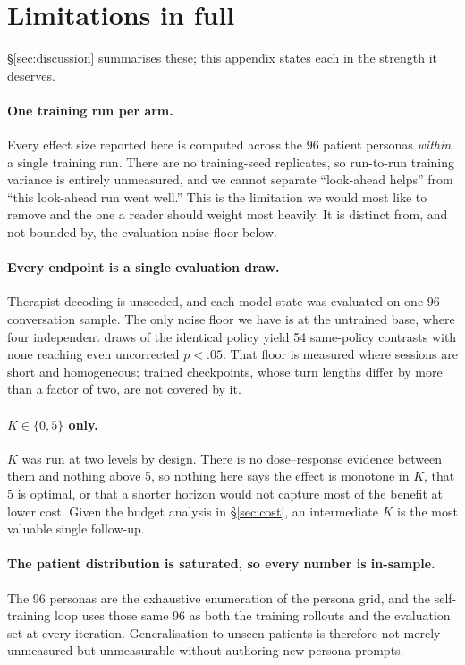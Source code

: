 \section{Limitations in full}
\label{app:limitations}

\S\ref{sec:discussion} summarises these; this appendix states each in the strength it deserves.

\paragraph{One training run per arm.}
Every effect size reported here is computed across the 96 patient personas \emph{within} a single
training run. There are no training-seed replicates, so run-to-run training variance is entirely
unmeasured, and we cannot separate ``look-ahead helps'' from ``this look-ahead run went well.''
This is the limitation we would most like to remove and the one a reader should weight most
heavily. It is distinct from, and not bounded by, the evaluation noise floor below.

\paragraph{Every endpoint is a single evaluation draw.}
Therapist decoding is unseeded, and each model state was evaluated on one 96-conversation sample.
The only noise floor we have is at the untrained base, where four independent draws of the
identical policy yield 54 same-policy contrasts with none reaching even uncorrected $p < .05$. That
floor is measured where sessions are short and homogeneous; trained checkpoints, whose turn lengths
differ by more than a factor of two, are not covered by it.

\paragraph{$K \in \{0, 5\}$ only.}
$K$ was run at two levels by design. There is no dose--response evidence between them and nothing
above 5, so nothing here says the effect is monotone in $K$, that 5 is optimal, or that a shorter
horizon would not capture most of the benefit at lower cost. Given the budget analysis in
\S\ref{sec:cost}, an intermediate $K$ is the most valuable single follow-up.

\paragraph{The patient distribution is saturated, so every number is in-sample.}
The 96 personas are the exhaustive enumeration of the persona grid, and the self-training loop uses
those same 96 as both the training rollouts and the evaluation set at every iteration.
Generalisation to unseen patients is therefore not merely unmeasured but unmeasurable without
authoring new persona prompts.

